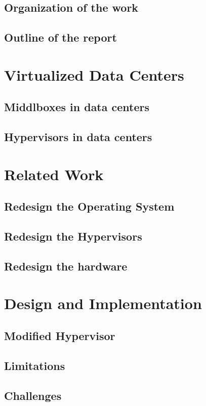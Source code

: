 \documentclass[a4paper,11pt]{report}
\begin{document}
\section{Organization of the work}  
\section{Outline of the report}    

\chapter{Virtualized Data Centers}
\section{Middlboxes in data centers}
\section{Hypervisors in data centers}

\chapter{Related Work}
\section{Redesign the Operating System}
\section{Redesign the Hypervisors}
\section{Redesign the hardware}

\chapter{Design and Implementation}
\section{Modified Hypervisor}
\section{Limitations}
\section{Challenges}
\end{document}
